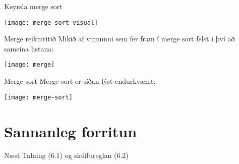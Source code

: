 \documentclass{beamer}
\begin{document}
\begin{frame}{Keyrsla merge sort}
\vspace{0.5cm}
\begin{center}
\texttt{[image: merge-sort-visual]}
\end{center}
\end{frame}

\begin{frame}{Merge reikniritið}
Mikið af vinnunni sem fer fram í merge sort felst í því að sameina listana:
\begin{center}
\texttt{[image: merge]}
\end{center}
\end{frame}

\begin{frame}{Merge sort}
Merge sort er síðan lýst endurkvæmt:
\begin{center}
\texttt{[image: merge-sort]}
\end{center}
\end{frame}

\section{Sannanleg forritun}


\begin{frame}{Næst}
Talning (6.1) og skúffureglan (6.2)
\end{frame}
\end{document}
